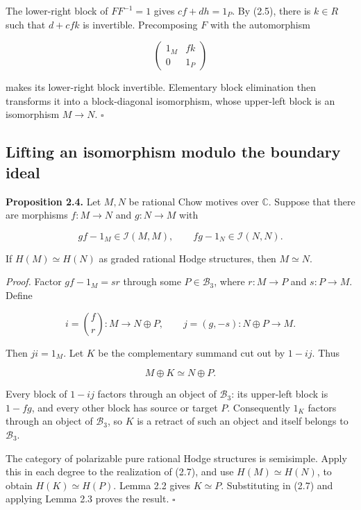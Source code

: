 \documentclass[11pt,a4paper]{article}
\begin{document}
The lower-right block of $FF^{-1}=1$ gives $cf+dh=1_P$. By (2.5), there is $k\in R$ such that $d+cfk$ is invertible. Precomposing $F$ with the automorphism

\begin{equation*}
\begin{pmatrix}1_M&fk\\0&1_P\end{pmatrix}
\end{equation*}

makes its lower-right block invertible. Elementary block elimination then transforms it into a block-diagonal isomorphism, whose upper-left block is an isomorphism $M\to N$. $\square$

\subsection{Lifting an isomorphism modulo the boundary ideal}

\noindent \textbf{Proposition 2.4.} Let $M,N$ be rational Chow motives over $\mathbb C$. Suppose that there are morphisms $f:M\to N$ and $g:N\to M$ with

\begin{equation*}
gf-1_M\in\mathcal I(M,M),
\qquad
fg-1_N\in\mathcal I(N,N).
\tag{2.6}
\end{equation*}

If $H(M)\simeq H(N)$ as graded rational Hodge structures, then $M\simeq N$.

\noindent \emph{Proof.} Factor $gf-1_M=sr$ through some $P\in\mathcal B_3$, where $r:M\to P$ and $s:P\to M$. Define

\begin{equation*}
i=\binom{f}{r}:M\longrightarrow N\oplus P,
\qquad
j=(g,-s):N\oplus P\longrightarrow M.
\end{equation*}

Then $ji=1_M$. Let $K$ be the complementary summand cut out by $1-ij$. Thus

\begin{equation*}
M\oplus K\simeq N\oplus P.
\tag{2.7}
\end{equation*}

Every block of $1-ij$ factors through an object of $\mathcal B_3$: its upper-left block is $1-fg$, and every other block has source or target $P$. Consequently $1_K$ factors through an object of $\mathcal B_3$, so $K$ is a retract of such an object and itself belongs to $\mathcal B_3$.

The category of polarizable pure rational Hodge structures is semisimple. Apply this in each degree to the realization of (2.7), and use $H(M)\simeq H(N)$, to obtain $H(K)\simeq H(P)$. Lemma 2.2 gives $K\simeq P$. Substituting in (2.7) and applying Lemma 2.3 proves the result. $\square$
\end{document}
